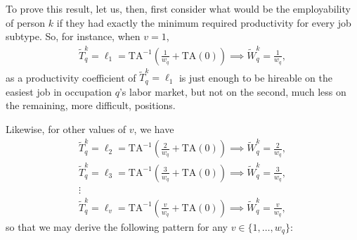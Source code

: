 \documentclass[hidelinks, nonatbib]{elsarticle}
\begin{document}
    To prove this result, let us, then, first consider what would be the employability of person $k$ if they had exactly the minimum required productivity for every job subtype. So, for instance, when $v = 1$,
    \begin{align}
        \tilde{T}_{q}^{k}
        =
        \ell_1
        =
        \text{TA}^{-1}
        \left(
            \frac{1}{w_q}
            +
            \text{TA}(0)
        \right)
        \implies
        \tilde{W}_{q}^{k}
        =
        \frac{1}{w_q}
        ,
    \end{align}
    as a productivity coefficient of $\tilde{T}_{q}^{k} = \ell_1$ is just enough to be hireable on the easiest job in occupation $q$'s labor market, but not on the second, much less on the remaining, more difficult, positions.
    
    Likewise, for other values of $v$, we have
    \begin{gather}
        \tilde{T}_{q}^{k}
        =
        \ell_2
        =
        \text{TA}^{-1}
        \left(
            \frac{2}{w_q}
            +
            \text{TA}(0)
        \right)
        \implies
        \tilde{W}_{q}^{k}
        =
        \frac{2}{w_q}
        ,
        \\
        \tilde{T}_{q}^{k}
        =
        \ell_3
        =
        \text{TA}^{-1}
        \left(
            \frac{3}{w_q}
            +
            \text{TA}(0)
        \right)
        \implies
        \tilde{W}_{q}^{k}
        =
        \frac{3}{w_q}
        ,
        \\
        \vdots
        \\
        \tilde{T}_{q}^{k}
        =
        \ell_{v}
        =
        \text{TA}^{-1}
        \left(
            \frac{v}{w_q}
            +
            \text{TA}(0)
        \right)
        \implies
        \tilde{W}_{q}^{k}
        =
        \frac{v}{w_q}
        ,
    \end{gather}
    so that we may derive the following pattern for any $v \in \{1, \dots, w_q\}$:
\end{document}
